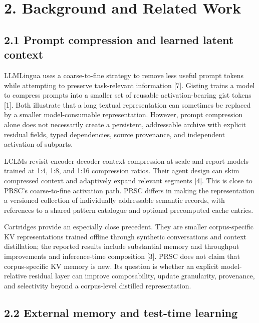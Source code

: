 \documentclass[
  10pt,
]{article}
\begin{document}
\section{2. Background and Related
Work}\label{background-and-related-work}

\subsection{2.1 Prompt compression and learned latent
context}\label{prompt-compression-and-learned-latent-context}

LLMLingua uses a coarse-to-fine strategy to remove less useful prompt
tokens while attempting to preserve task-relevant information {[}7{]}.
Gisting trains a model to compress prompts into a smaller set of
reusable activation-bearing gist tokens {[}1{]}. Both illustrate that a
long textual representation can sometimes be replaced by a smaller
model-consumable representation. However, prompt compression alone does
not necessarily create a persistent, addressable archive with explicit
residual fields, typed dependencies, source provenance, and independent
activation of subparts.

LCLMs revisit encoder-decoder context compression at scale and report
models trained at 1:4, 1:8, and 1:16 compression ratios. Their agent
design can skim compressed context and adaptively expand relevant
segments {[}4{]}. This is close to PRSC's coarse-to-fine activation
path. PRSC differs in making the representation a versioned collection
of individually addressable semantic records, with references to a
shared pattern catalogue and optional precomputed cache entries.

Cartridges provide an especially close precedent. They are smaller
corpus-specific KV representations trained offline through synthetic
conversations and context distillation; the reported results include
substantial memory and throughput improvements and inference-time
composition {[}3{]}. PRSC does not claim that corpus-specific KV memory
is new. Its question is whether an explicit model-relative residual
layer can improve composability, update granularity, provenance, and
selectivity beyond a corpus-level distilled representation.

\subsection{2.2 External memory and test-time
learning}\label{external-memory-and-test-time-learning}
\end{document}
